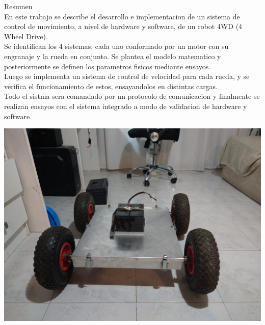 {\LARGE Resumen}\\

En este trabajo se describe el desarrollo e implementacion de un sistema de control de movimiento, a nivel de hardware y software, de un robot 4WD (4 Wheel Drive).\\
Se identifican los 4 sistemas, cada uno conformado por un motor con su engranaje y la rueda en conjunto. Se plantea el modelo matematico y posteriormente se definen los parametros fisicos mediante ensayos.\\
Luego se implementa un sistema de control de velocidad para cada rueda, y se verifica el funcionamiento de estos, ensayandolos en distintas cargas.\\
Todo el sistma sera comandado por un protocolo de comunicacion y finalmente se realizan ensayos con el sistema integrado a modo de validacion de hardware y software.


\includegraphics[scale = 0.1]{img/FotoDePresentacion.jpg}

